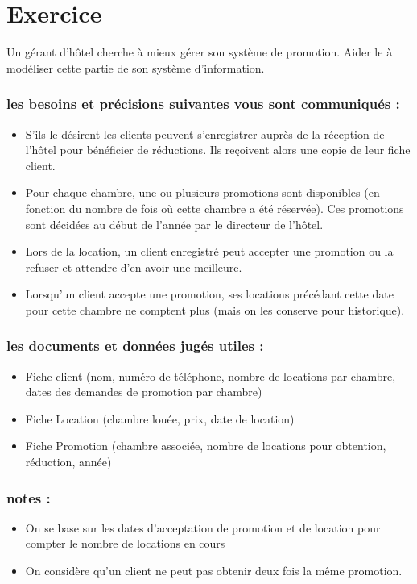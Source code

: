 \section*{Exercice}
Un gérant d'hôtel cherche à mieux gérer son système de promotion. Aider le à modéliser cette partie de son système d'information.

\subsubsection*{les besoins et précisions suivantes vous sont communiqués :}
\begin{itemize}
    \item S'ils le désirent les clients peuvent s'enregistrer auprès de la réception de l'hôtel pour bénéficier de réductions. Ils reçoivent alors une copie de leur fiche client.
    \item Pour chaque chambre, une ou plusieurs promotions sont disponibles (en fonction du nombre de fois où cette chambre a été réservée). Ces promotions sont décidées au début de l'année par le directeur de l'hôtel.
    \item Lors de la location, un client enregistré peut accepter une promotion ou la refuser et attendre d'en avoir une meilleure.
    \item Lorsqu'un client accepte une promotion, ses locations précédant cette date pour cette chambre ne comptent plus (mais on les conserve pour historique).
\end{itemize}

\subsubsection*{les documents et données jugés utiles :}
\begin{itemize}
    \item Fiche client (nom, numéro de téléphone, nombre de locations par chambre, dates des demandes de promotion par chambre)
    \item Fiche Location (chambre louée, prix, date de location)
    \item Fiche Promotion (chambre associée, nombre de locations pour obtention, réduction, année)
\end{itemize}

\subsubsection*{notes :}
\begin{itemize}
    \item On se base sur les dates d'acceptation de promotion et de location pour compter le nombre de locations en cours
    \item On considère qu'un client ne peut pas obtenir deux fois la même promotion.
\end{itemize}
